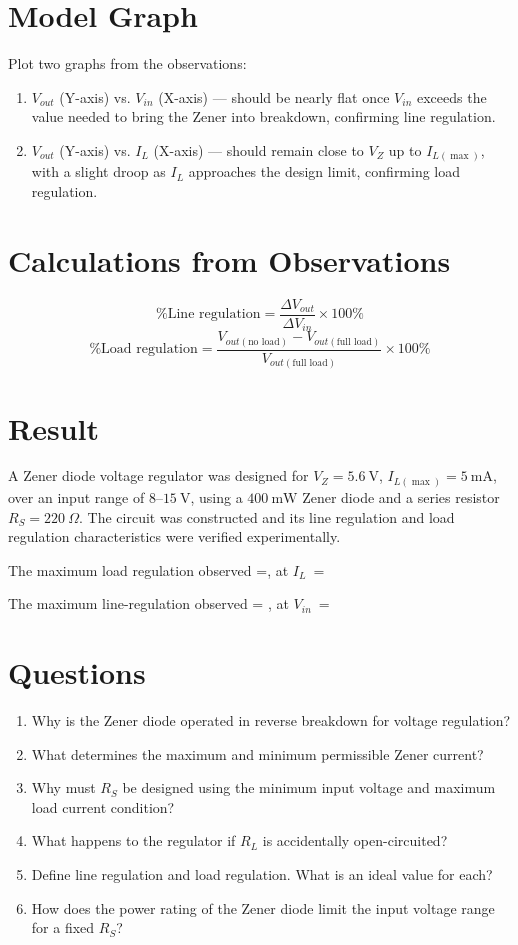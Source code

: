 \section{Model Graph}
Plot two graphs from the observations:
\begin{enumerate}
	\item $V_{out}$ (Y-axis) vs. $V_{in}$ (X-axis) — should be nearly flat once $V_{in}$ exceeds the value needed to bring the Zener into breakdown, confirming line regulation.
	\item $V_{out}$ (Y-axis) vs. $I_L$ (X-axis) — should remain close to $V_Z$ up to $I_{L(\max)}$, with a slight droop as $I_L$ approaches the design limit, confirming load regulation.
\end{enumerate}

\section{Calculations from Observations}
\[
\text{\% Line regulation} = \frac{\Delta V_{out}}{\Delta V_{in}} \times 100\%
\]
\[
\text{\% Load regulation} = \frac{V_{out(\text{no load})} - V_{out(\text{full load})}}{V_{out(\text{full load})}} \times 100\%
\]

\section{Result}
A Zener diode voltage regulator was designed for $V_Z = 5.6\ \text{V}$,
$I_{L(\max)} = 5\ \text{mA}$, over an input range of $8$--$15\ \text{V}$, using
a $400\ \text{mW}$ Zener diode and a series resistor $R_S = 220\ \Omega$. The
circuit was constructed and its line regulation and load regulation
characteristics were verified experimentally. 

The maximum load regulation observed =\hspace{2cm}, at $I_L\ =\ $

The maximum line-regulation observed = \hspace{2cm}, at $V_{in}\ =\ $

\section{Questions}
\begin{enumerate}
	\item Why is the Zener diode operated in reverse breakdown for voltage regulation?
	\item What determines the maximum and minimum permissible Zener current?
	\item Why must $R_S$ be designed using the minimum input voltage and maximum load current condition?
	\item What happens to the regulator if $R_L$ is accidentally open-circuited?
	\item Define line regulation and load regulation. What is an ideal value for each?
	\item How does the power rating of the Zener diode limit the input voltage range for a fixed $R_S$?
\end{enumerate}